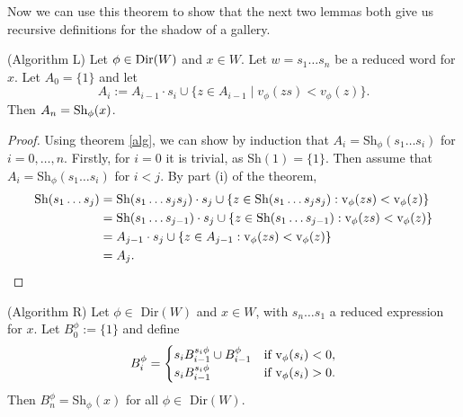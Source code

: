 \documentclass[11pt]{article}
\begin{document}

Now we can use this theorem to show that the next two lemmas both give us recursive definitions for the shadow of a gallery. 

\begin{lemma} (Algorithm L)
    Let $\phi\in\textnormal{Dir}(W)$ and $x\in W$. Let $w=s_1\hdots s_n$ be a reduced word for $x$. Let $A_0=\{1\}$ and let
    \[A_i:=A_{i-1}\cdot s_i\cup \{z\in A_{i-1}\mid v_\phi(zs)<v_\phi(z)\}.\]
    Then $A_n=\textnormal{Sh}_\phi(x)$. 
\end{lemma}

\begin{proof}
    Using theorem \ref{alg}, we can show by induction that $A_i=$Sh$_\phi(s_1\hdots s_i)$ for $i=0,\hdots ,n$. Firstly, for $i=0$ it is trivial, as Sh$(1)=\{1\}$. Then assume that $A_i=$Sh$_\phi(s_1\hdots s_i)$ for $i<j$. By part (i) of the theorem,\[\begin{aligned}
    \textnormal{Sh}(s_1\hdots s_j)& = \textnormal{Sh}(s_1\hdots s_js_j)\cdot s_j \cup \{z\in \textnormal{Sh}(s_1\hdots s_js_j): \textnormal{v}_\phi(zs)<\textnormal{v}_\phi(z)\}\\
        & = \textnormal{Sh}(s_1\hdots s_{j-1})\cdot s_j \cup \{z\in \textnormal{Sh}(s_1\hdots s_{j-1}): \textnormal{v}_\phi(zs)<\textnormal{v}_\phi(z)\}\\
        & = A_{j-1}\cdot s_j \cup \{z\in A_{j-1}: \textnormal{v}_\phi(zs)<\textnormal{v}_\phi(z)\}\\
        & = A_j.
    \end{aligned}\]
\end{proof}

\begin{lemma} (Algorithm R)
    Let $\phi\in$ Dir$(W)$ and $x\in W$, with $s_n\hdots s_1$ a reduced expression for $x$. Let $B_0^\phi:=\{1\}$ and define
    \[B_i^\phi = \begin{cases}
        s_iB_{i-1}^{s_i\phi}\cup B_{i-1}^\phi & \textnormal{if v}_\phi(s_i)<0,\\
        s_iB_{i-1}^{s_i\phi} & \textnormal{if v}_\phi(s_i)>0.
    \end{cases}\]
    Then $B^\phi_n=$Sh$_\phi(x)$ for all $\phi\in$ Dir$(W)$. 
\end{lemma}
\end{document}
